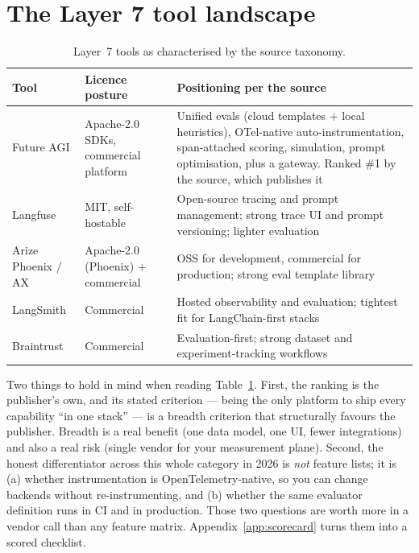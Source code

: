 \documentclass[11pt,twoside,openright]{book}
\theoremstyle{definition}
\theoremstyle{plain}
\theoremstyle{remark}
\begin{document}
\section{The Layer 7 tool landscape}

\begin{table}[H]
\centering\footnotesize
\renewcommand{\arraystretch}{1.3}
\begin{tabularx}{\textwidth}{@{}l l X@{}}
\toprule
\textbf{Tool} & \textbf{Licence posture} & \textbf{Positioning per the source} \\
\midrule
Future AGI & Apache-2.0 SDKs, commercial platform &
  Unified evals (cloud templates + local heuristics), OTel-native
  auto-instrumentation, span-attached scoring, simulation, prompt optimisation,
  plus a gateway. Ranked \#1 by the source, which publishes it \\
Langfuse & MIT, self-hostable &
  Open-source tracing and prompt management; strong trace UI and prompt
  versioning; lighter evaluation \\
Arize Phoenix / AX & Apache-2.0 (Phoenix) + commercial &
  OSS for development, commercial for production; strong eval template library \\
LangSmith & Commercial &
  Hosted observability and evaluation; tightest fit for LangChain-first stacks \\
Braintrust & Commercial &
  Evaluation-first; strong dataset and experiment-tracking workflows \\
\bottomrule
\end{tabularx}
\caption{Layer~7 tools as characterised by the source taxonomy.}
\label{tab:llmops}
\end{table}

\begin{vendorwatch}
Two things to hold in mind when reading Table~\ref{tab:llmops}. First, the
ranking is the publisher's own, and its stated criterion --- being the only
platform to ship every capability ``in one stack'' --- is a breadth criterion
that structurally favours the publisher. Breadth is a real benefit (one data
model, one UI, fewer integrations) and also a real risk (single vendor for your
measurement plane). Second, the honest differentiator across this whole category
in 2026 is \emph{not} feature lists; it is (a) whether instrumentation is
OpenTelemetry-native, so you can change backends without re-instrumenting, and
(b) whether the same evaluator definition runs in CI and in production. Those
two questions are worth more in a vendor call than any feature matrix.
Appendix~\ref{app:scorecard} turns them into a scored checklist.
\end{vendorwatch}
\end{document}
